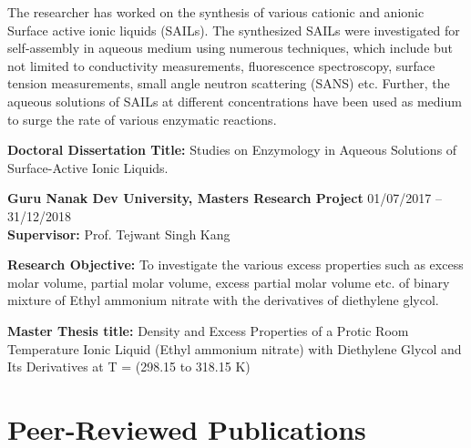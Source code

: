 \documentclass[11pt,a4paper]{article}
\begin{document}
The researcher has worked on the synthesis of various cationic and anionic Surface active ionic liquids (SAILs). The synthesized SAILs were investigated for self-assembly in aqueous medium using numerous techniques, which include but not limited to conductivity measurements, fluorescence spectroscopy, surface tension measurements, small angle neutron scattering (SANS) etc. Further, the aqueous solutions of SAILs at different concentrations have been used as medium to surge the rate of various enzymatic reactions.

\textbf{Doctoral Dissertation Title:} Studies on Enzymology in Aqueous Solutions of Surface-Active Ionic Liquids.

\textbf{Guru Nanak Dev University, Masters Research Project} \hfill 01/07/2017 -- 31/12/2018\\
\textbf{Supervisor:} Prof. Tejwant Singh Kang

\textbf{Research Objective:} To investigate the various excess properties such as excess molar volume, partial molar volume, excess partial molar volume etc. of binary mixture of Ethyl ammonium nitrate with the derivatives of diethylene glycol.

\textbf{Master Thesis title:} Density and Excess Properties of a Protic Room Temperature Ionic Liquid (Ethyl ammonium nitrate) with Diethylene Glycol and Its Derivatives at T = (298.15 to 318.15 K)

\vspace{0.6cm}

\section*{Peer-Reviewed Publications}
\end{document}
